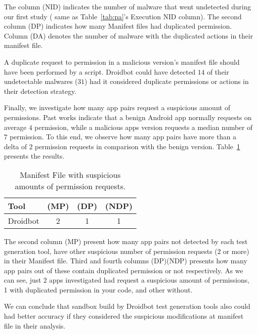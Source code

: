 The column (NID) indicates the number of malware that went undetected during our first study ( same as Table~\ref{tab:pa}'s Execution NID column). The second column (DP) indicates how many Manifest files had duplicated permission. Column (DA) denotes the number of malware with the duplicated actions in their manifest file.

A duplicate request to permission in a malicious version's manifest file should have been performed by a script.  Droidbot could have detected $14$ of their undetectable malwares ($31$) had it considered duplicate permissions or actions in their detection strategy.

Finally, we investigate how many app pairs request a suspicious amount of permissions. Past works indicate that a benign Android app normally requests on average $4$ permission, while a malicious apps version requests a median number of $7$ permission\cite{DBLP:conf/soups/FeltHEHCW12}\cite{DBLP:journals/tifs/0029LBKTLC17}. To this end, we observe how many app pairs have more than a delta of $2$ permission requests in comparison with the benign version. Table~\ref{tab:mp} presents the results.

\begin{table}[ht]
  \caption{Manifest File with suspicious amounts of permission requests.}
  \centering
  \begin{small}
 \begin{tabular}{lccc}
   \toprule
   Tool & (MP) & (DP) & (NDP) \\   \midrule
   
   Droidbot &  2 & 1 & 1 \\ 
   
 \bottomrule
 \end{tabular}
 \end{small}
 \label{tab:mp}
\end{table}

The second column (MP) present how many app pairs not detected by each test generation tool, have other suspicious number of permission requests ($2$ or more) in their Manifest file. Third and fourth columns (DP)(NDP) presents how many app pairs out of these contain duplicated permission or not respectively. As we can see, just 2 apps investigated had request a suspicious amount of permissions, 1 with duplicated permission in your code, and other without.


\begin{obs}{3}{}
 We can conclude that sandbox build by Droidbot test generation tools also could had better accuracy if they considered the suspicious modifications at manifest file in their analysis.
\end{obs}

